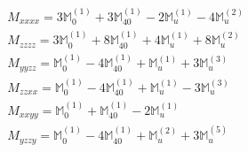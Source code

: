\documentclass[fleqn,8pt,landscape]{jsarticle}
\begin{document}
\begin{align*}
& M_{xxxx} = 3 \mathbb{M}_{0}^{(1)} + 3 \mathbb{M}_{40}^{(1)} - 2 \mathbb{M}_{u}^{(1)} - 4 \mathbb{M}_{u}^{(2)} \\
& M_{zzzz} = 3 \mathbb{M}_{0}^{(1)} + 8 \mathbb{M}_{40}^{(1)} + 4 \mathbb{M}_{u}^{(1)} + 8 \mathbb{M}_{u}^{(2)} \\
& M_{yyzz} = \mathbb{M}_{0}^{(1)} - 4 \mathbb{M}_{40}^{(1)} + \mathbb{M}_{u}^{(1)} + 3 \mathbb{M}_{u}^{(3)} \\
& M_{zzxx} = \mathbb{M}_{0}^{(1)} - 4 \mathbb{M}_{40}^{(1)} + \mathbb{M}_{u}^{(1)} - 3 \mathbb{M}_{u}^{(3)} \\
& M_{xxyy} = \mathbb{M}_{0}^{(1)} + \mathbb{M}_{40}^{(1)} - 2 \mathbb{M}_{u}^{(1)} \\
& M_{yzzy} = \mathbb{M}_{0}^{(1)} - 4 \mathbb{M}_{40}^{(1)} + \mathbb{M}_{u}^{(2)} + 3 \mathbb{M}_{u}^{(5)}
\end{align*}
\end{document}
